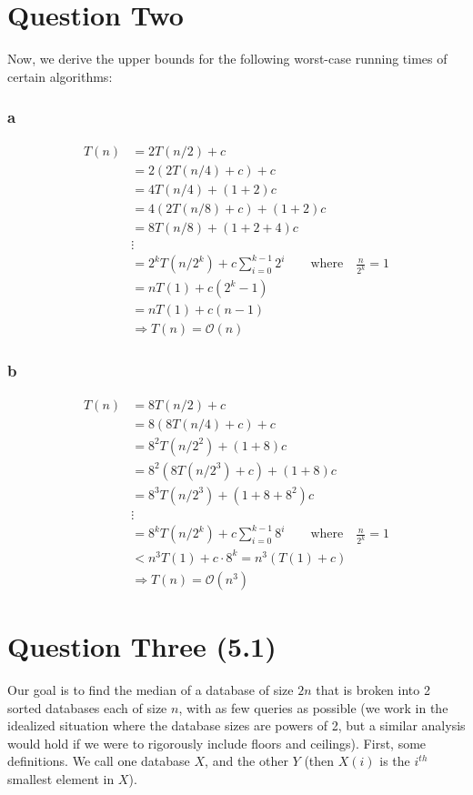 \documentclass[11pt,letterpaper]{article}
\begin{document}
\section*{Question Two}
Now, we derive the upper bounds for the following worst-case running times of certain algorithms: 
\subsubsection*{a}
\begin{align*}
	T(n) &= 2 T(n/2) + c \\
	&= 2(2T(n/4) + c) + c \\
	&= 4T(n/4) + (1+2)c \\
	&= 4(2T(n/8) + c) + (1+2)c \\
	&= 8T(n/8) + (1+2+4)c \\
	&\vdots \\
	&= 2^k T(n/2^k) + c\sum_{i=0}^{k-1}2^i \qquad \mbox{where} \quad \frac{n}{2^k} = 1\\
	&= n T(1) + c (2^{k}-1) \\
	&= nT(1) + c(n-1) \\
	&\Rightarrow T(n) = \mathcal{O}(n)
\end{align*}

\subsubsection*{b}
\begin{align*}
	T(n) &= 8 T(n/2) + c \\
	&= 8(8T(n/4) + c) + c \\
	&= 8^2T(n/2^2) + (1 + 8)c \\
	&= 8^2 (8T(n/2^3) + c) + (1+8)c \\
	&= 8^3 T(n/2^3) + (1 + 8 + 8^2)c \\
	&\vdots \\
	&= 8^kT(n/2^k) + c\sum_{i=0}^{k-1}8^i \qquad \mbox{where} \quad \frac{n}{2^k} = 1 \\
	&< n^3 T(1) + c\cdot 8^k = n^3 (T(1) + c) \\
	&\Rightarrow T(n) = \mathcal{O}(n^3)
\end{align*}

\section*{Question Three (5.1)}
Our goal is to find the median of a database of size $2n$ that is broken into 2 sorted databases each of size $n$, with as few queries as possible (we work in the idealized situation where the database sizes are powers of 2, but a similar analysis would hold if we were to rigorously include floors and ceilings). First, some definitions. We call one database $X$, and the other $Y$ (then $X(i)$ is the $i^{th}$ smallest element in $X$).
\end{document}
